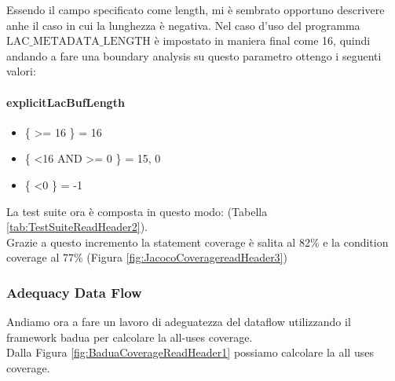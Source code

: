 \documentclass[12pt, a4paper]{article}
\begin{document}
Essendo il campo specificato come length, mi è sembrato opportuno descrivere anhe il caso in cui la lunghezza è negativa.
Nel caso d'uso del programma $\text{LAC\_METADATA\_LENGTH}$ è impostato in maniera final come 16, quindi andando a fare una boundary
analysis su questo parametro ottengo i seguenti valori:

\paragraph{explicitLacBufLength}
\begin{itemize}
  \item \{ \textgreater= 16 \} = 16
  \item \{ \textless 16 AND \textgreater= 0 \} = 15, 0
  \item \{ \textless 0 \} = -1
\end{itemize}
La test suite ora è composta in questo modo: (Tabella \ref{tab:TestSuiteReadHeader2}). \\
Grazie a questo incremento la statement coverage è salita al 82\%
e la condition coverage al 77\% (Figura \ref{fig:JacocoCoveragereadHeader3})



\subsubsection{Adequacy Data Flow}

Andiamo ora a fare un lavoro di adeguatezza del dataflow utilizzando il framework badua per calcolare la all-uses coverage. \\
Dalla Figura \ref{fig:BaduaCoverageReadHeader1} possiamo calcolare la all uses coverage. \\
\end{document}
